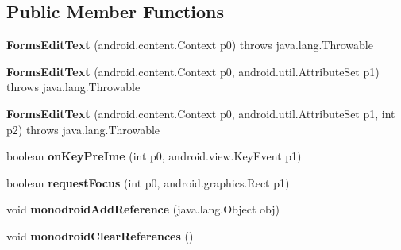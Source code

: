 \subsection*{Public Member Functions}
\begin{DoxyCompactItemize}
\item 
\mbox{\label{classmd5b60ffeb829f638581ab2bb9b1a7f4f3f_1_1FormsEditText_a3b62a7c8e08706ae0e5e3fc89d15870f}} 
{\bfseries Forms\+Edit\+Text} (android.\+content.\+Context p0)  throws java.\+lang.\+Throwable 	
\item 
\mbox{\label{classmd5b60ffeb829f638581ab2bb9b1a7f4f3f_1_1FormsEditText_afcf275c44999585a2a5d2eedde13e104}} 
{\bfseries Forms\+Edit\+Text} (android.\+content.\+Context p0, android.\+util.\+Attribute\+Set p1)  throws java.\+lang.\+Throwable 	
\item 
\mbox{\label{classmd5b60ffeb829f638581ab2bb9b1a7f4f3f_1_1FormsEditText_aaba2de54573e38c8c55109e4735d016a}} 
{\bfseries Forms\+Edit\+Text} (android.\+content.\+Context p0, android.\+util.\+Attribute\+Set p1, int p2)  throws java.\+lang.\+Throwable 	
\item 
\mbox{\label{classmd5b60ffeb829f638581ab2bb9b1a7f4f3f_1_1FormsEditText_a9da716bfd9ed6cc587648da33453634a}} 
boolean {\bfseries on\+Key\+Pre\+Ime} (int p0, android.\+view.\+Key\+Event p1)
\item 
\mbox{\label{classmd5b60ffeb829f638581ab2bb9b1a7f4f3f_1_1FormsEditText_a2cf9da01b54b44653275914d490d9716}} 
boolean {\bfseries request\+Focus} (int p0, android.\+graphics.\+Rect p1)
\item 
\mbox{\label{classmd5b60ffeb829f638581ab2bb9b1a7f4f3f_1_1FormsEditText_aabff92edb59e12022a3bad902cad5b3c}} 
void {\bfseries monodroid\+Add\+Reference} (java.\+lang.\+Object obj)
\item 
\mbox{\label{classmd5b60ffeb829f638581ab2bb9b1a7f4f3f_1_1FormsEditText_a842c9f28b9164b840f11c15e502397ff}} 
void {\bfseries monodroid\+Clear\+References} ()
\end{DoxyCompactItemize}
